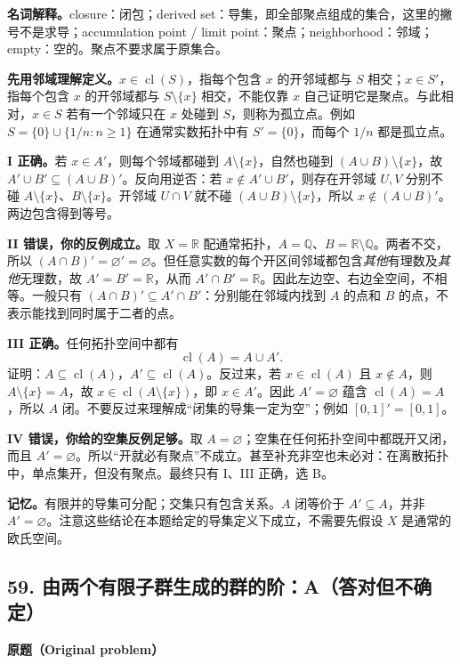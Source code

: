 \documentclass[11pt,a4paper,fontset=fandol]{ctexart}
\begin{document}
\textbf{名词解释。}closure：闭包；derived set：导集，即全部聚点组成的集合，这里的撇号不是求导；accumulation point / limit point：聚点；neighborhood：邻域；empty：空的。聚点不要求属于原集合。

\textbf{先用邻域理解定义。}$x\in\operatorname{cl}(S)$，指每个包含 $x$ 的开邻域都与 $S$ 相交；$x\in S'$，指每个包含 $x$ 的开邻域都与 $S\setminus\{x\}$ 相交，不能仅靠 $x$ 自己证明它是聚点。与此相对，$x\in S$ 若有一个邻域只在 $x$ 处碰到 $S$，则称为孤立点。例如 $S=\{0\}\cup\{1/n:n\ge1\}$ 在通常实数拓扑中有 $S'=\{0\}$，而每个 $1/n$ 都是孤立点。

\textbf{I 正确。}若 $x\in A'$，则每个邻域都碰到 $A\setminus\{x\}$，自然也碰到 $(A\cup B)\setminus\{x\}$，故 $A'\cup B'\subseteq(A\cup B)'$。反向用逆否：若 $x\notin A'\cup B'$，则存在开邻域 $U,V$ 分别不碰 $A\setminus\{x\}$、$B\setminus\{x\}$。开邻域 $U\cap V$ 就不碰 $(A\cup B)\setminus\{x\}$，所以 $x\notin(A\cup B)'$。两边包含得到等号。

\textbf{II 错误，你的反例成立。}取 $X=\mathbb R$ 配通常拓扑，$A=\mathbb Q$、$B=\mathbb R\setminus\mathbb Q$。两者不交，所以 $(A\cap B)'=\varnothing'=\varnothing$。但任意实数的每个开区间邻域都包含\emph{其他}有理数及\emph{其他}无理数，故 $A'=B'=\mathbb R$，从而 $A'\cap B'=\mathbb R$。因此左边空、右边全空间，不相等。一般只有 $(A\cap B)'\subseteq A'\cap B'$：分别能在邻域内找到 $A$ 的点和 $B$ 的点，不表示能找到同时属于二者的点。

\textbf{III 正确。}任何拓扑空间中都有
\begin{equation}
\operatorname{cl}(A)=A\cup A'.
\label{p3:closure-derived}
\end{equation}
证明：$A\subseteq\operatorname{cl}(A)$，$A'\subseteq\operatorname{cl}(A)$。反过来，若 $x\in\operatorname{cl}(A)$ 且 $x\notin A$，则 $A\setminus\{x\}=A$，故 $x\in\operatorname{cl}(A\setminus\{x\})$，即 $x\in A'$。因此 $A'=\varnothing$ 蕴含 $\operatorname{cl}(A)=A$，所以 $A$ 闭。不要反过来理解成“闭集的导集一定为空”；例如 $[0,1]'=[0,1]$。

\textbf{IV 错误，你给的空集反例足够。}取 $A=\varnothing$；空集在任何拓扑空间中都既开又闭，而且 $A'=\varnothing$。所以“开就必有聚点”不成立。甚至补充非空也未必对：在离散拓扑中，单点集开，但没有聚点。最终只有 I、III 正确，选 B。

\textbf{记忆。}有限并的导集可分配；交集只有包含关系。$A$ 闭等价于 $A'\subseteq A$，并非 $A'=\varnothing$。注意这些结论在本题给定的导集定义下成立，不需要先假设 $X$ 是通常的欧氏空间。

\subsection{59. 由两个有限子群生成的群的阶：A（答对但不确定）}
\label{p3:q59}
\textbf{原题（Original problem）}
\end{document}
